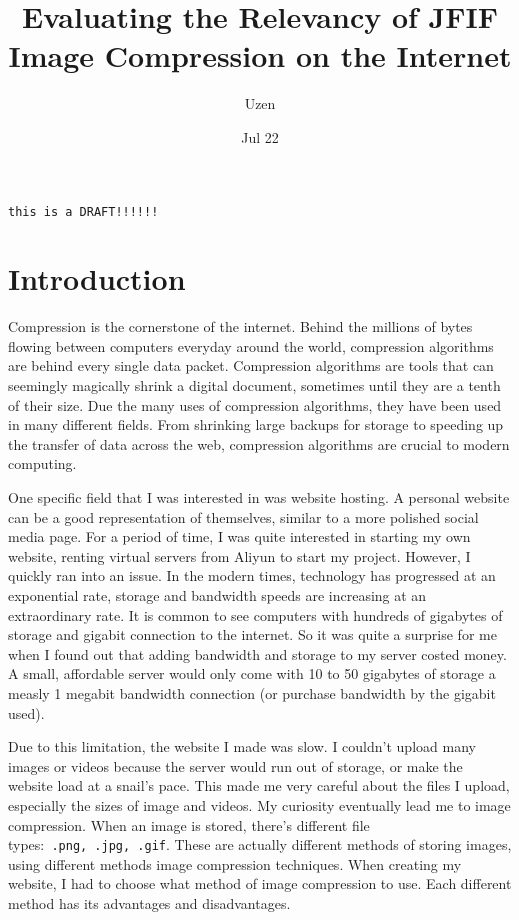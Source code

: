\documentclass{article}
\title{Evaluating the Relevancy of JFIF Image Compression on the Internet}
\author{Uzen}
\date{Jul 22}
\begin{document}
\maketitle

{\LARGE \tt this is a DRAFT!!!!!!}

\tableofcontents
\newpage

\section{Introduction}

Compression is the cornerstone of the internet.
Behind the millions of bytes flowing between computers everyday around the world, compression algorithms are behind every single data packet.
Compression algorithms are tools that can seemingly magically shrink a digital document, sometimes until they are a tenth of their size.
Due the many uses of compression algorithms, they have been used in many different fields.
From shrinking large backups for storage to speeding up the transfer of data across the web, compression algorithms are crucial to modern computing.

One specific field that I was interested in was website hosting.
A personal website can be a good representation of themselves, similar to a more polished social media page.
For a period of time, I was quite interested in starting my own website, renting virtual servers from Aliyun to start my project.
However, I quickly ran into an issue.
In the modern times, technology has progressed at an exponential rate, storage and bandwidth speeds are increasing at an extraordinary rate.
It is common to see computers with hundreds of gigabytes of storage and gigabit connection to the internet.
So it was quite a surprise for me when I found out that adding bandwidth and storage to my server costed money.
A small, affordable server would only come with 10 to 50 gigabytes of storage a measly 1 megabit bandwidth connection (or purchase bandwidth by the gigabit used).

Due to this limitation, the website I made was slow.
I couldn't upload many images or videos because the server would run out of storage, or make the website load at a snail's pace.
This made me very careful about the files I upload, especially the sizes of image and videos.
My curiosity eventually lead me to image compression.
When an image is stored, there's different file types:\texttt{~.png,~.jpg,~.gif}.
These are actually different methods of storing images, using different methods image compression techniques.
When creating my website, I had to choose what method of image compression to use.
Each different method has its advantages and disadvantages.
\end{document}
